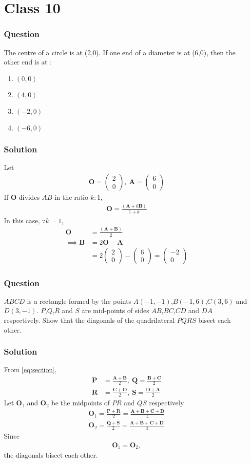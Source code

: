 \documentclass{beamer}
\providecommand{\brak}[1]{\ensuremath{\left(#1\right)}}
\theoremstyle{remark}
\newcommand{\myvec}[1]{\ensuremath{\begin{pmatrix}#1\end{pmatrix}}}
\let\vec\mathbf
\begin{document}
\section{Class 10}
\begin{frame}
\frametitle{Question}
The centre of a circle is at (2,0). If one end of a diameter is at (6,0), then the other end is at :
\begin{enumerate}
\item $\brak{0,0}$
\item $\brak{4,0}$
\item $\brak{-2,0}$
\item $\brak{-6,0}$
\end{enumerate}
\end{frame}
%
\begin{frame}
\frametitle{Solution}
Let
\begin{align}
	\vec{O} =
    \myvec{
2 \\
0 
},\
\vec{A} =
    \myvec{
6 \\
0 
}
\end{align}
If $\vec{O}$
divides $AB$ in the ratio $k:1$,
\begin{align}
	\label{eq:section}
\vec{O} = \frac{\brak{\vec{A} +k \vec{B}}}{1+k}
\end{align}
In this case,  $\because k = 1$,
\begin{align}
\vec{O} &= \frac{\brak{\vec{A} + \vec{B}}}{2}\\
\implies \vec{B} &= 2\vec{O} - \vec{A}\\
    &=  2\myvec{
2 \\
0 
} -  \myvec{
6 \\
0 
}
=\myvec{
   -2\\
   0
}
\end{align}
\end{frame}
\begin{frame}
\frametitle{Question }
$ABCD$ is a rectangle formed by the points $A\brak{-1,-1}$,$B\brak{-1,6}$,$C\brak{3,6}$ and $D\brak{3,-1}$. $P$,$Q$,$R$ and $S$ are mid-points of sides $AB$,$BC$,$CD$ and $DA$ respectively. Show that the diagonals of the quadrilateral $PQRS$ bisect each other. 
\end{frame}
%
\begin{frame}
\frametitle{Solution}
	From \eqref{eq:section},
\begin{align}
    \vec{P}&=\frac{\vec{A}+\vec{B}}{2},\
        \vec{Q}=\frac{\vec{B}+\vec{C}}{2}\\
    \vec{R}&=\frac{\vec{C}+\vec{D}}{2},\
    \vec{S}=\frac{\vec{D}+\vec{A}}{2}
    \end{align}
Let $\vec{O}_1$ and $\vec{O}_2$ be the midpoints of $PR$ and $QS$ respectively
\begin{align}
    \vec{O}_1 = \frac{\vec{P}+\vec{R}}{2}=\frac{\vec{A}+\vec{B}+\vec{C}+\vec{D}}{4}\\
      \vec{O}_2 = \frac{\vec{Q}+\vec{S}}{2}=\frac{\vec{A}+\vec{B}+\vec{C}+\vec{D}}{4}
\end{align}
Since 
\begin{align}
    \vec{O}_1     = \vec{O}_2,
\end{align}
 the diagonals bisect each other. 
\end{frame}
\end{document}
